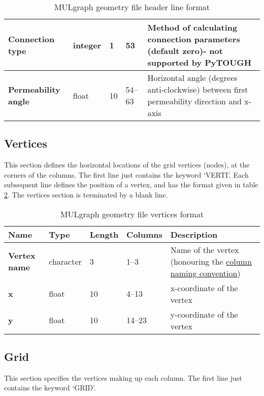 \begin{table}
\begin{center}
\begin{tabular}{|p{20mm}|l|l|l|p{50mm}|}
      \hline
      \textbf{Connection type} & integer & 1 & 53 & Method of calculating connection parameters (default zero)- not supported by PyTOUGH\\
      \hline
      \textbf{Permeability angle} & float & 10 & 54--63 & Horizontal angle (degrees anti-clockwise) between first permeability direction and x-axis\\
      \hline
    \end{tabular}
    \caption{MULgraph geometry file header line format}
    \label{tb:mulgraph_format_header}
  \end{center}
\end{table}

\subsection{Vertices}
This section defines the horizontal locations of the grid vertices (nodes), at the corners of the columns. The first line just contains the keyword `VERTI'. Each subsequent line defines the position of a vertex, and has the format given in table \ref{tb:mulgraph_format_vertices}. The vertices section is terminated by a blank line.

\begin{table}
  \begin{center}
    \begin{tabular}{|p{20mm}|l|l|l|p{50mm}|}
      \hline
      \textbf{Name} & \textbf{Type} & \textbf{Length} & \textbf{Columns} & \textbf{Description}\\
      \hline
      \textbf{Vertex name} & character & 3 & 1--3 & Name of the vertex (honouring the \hyperref[tb:mulgrid_conventions]{column naming convention})\\
      \hline
      \textbf{x} & float & 10 & 4--13 & x-coordinate of the vertex\\
      \hline
      \textbf{y} & float & 10 & 14--23 & y-coordinate of the vertex\\
      \hline
    \end{tabular}
    \caption{MULgraph geometry file vertices format}
    \label{tb:mulgraph_format_vertices}
  \end{center}
\end{table}

\subsection{Grid}
This section specifies the vertices making up each column. The first line just contains the keyword `GRID'.

